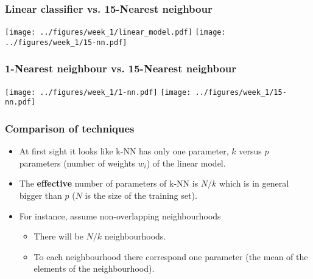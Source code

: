 \documentclass[notes]{beamer}          %
\newif\iffull
\begin{document}
\begin{frame}
\frametitle{Linear classifier vs. 15-Nearest neighbour}
    \begin{center}
        \texttt{[image: ../figures/week\_1/linear\_model.pdf]}
        \hfill
        \texttt{[image: ../figures/week\_1/15-nn.pdf]}
    \end{center}
\end{frame}


\begin{frame}
\frametitle{1-Nearest neighbour vs. 15-Nearest neighbour}
    \begin{center}
        \texttt{[image: ../figures/week\_1/1-nn.pdf]}
        \hfill
        \texttt{[image: ../figures/week\_1/15-nn.pdf]}
    \end{center}
\end{frame}

\iffull
\begin{frame}
\frametitle{Comparison of the techniques}
    \begin{itemize}
        \item 15-NN seems to work better than the linear classifier since fewer points are missclassified.
        \item On the other hand, {\bf none} of the points in the 1-NN case was misclassified!?
        \item Actually with the 1-NN method the error on {\bf training data} is always 0.
        \item An independent test set needed to obtain a better comparison of the methods.
    \end{itemize}
\end{frame}
\fi


\begin{frame}
\frametitle{Comparison of techniques}

    \begin{itemize}
        \item At first sight it looks like k-NN has only one parameter, $k$ versus $p$ parameters (number of weights $w_i$) of the linear model.
        \item The {\bf effective}  number of parameters of k-NN is $N/k$ which is in general bigger than $p$ ($N$ is the size of the training set).
        \item For instance, assume non-overlapping neighbourhoods
            \begin{itemize}
                \item There will be $N/k$ neighbourhoods.
                \item To each neighbourhood there correspond one parameter (the mean of the elements of the neighbourhood).
            \end{itemize}
    \end{itemize}

\end{frame}
\end{document}
